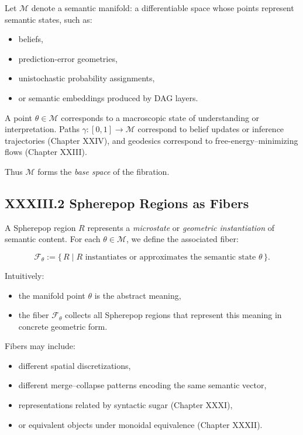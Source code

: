 \documentclass[11pt,letterpaper]{article}
\begin{document}
Let $\mathcal{M}$ denote a semantic manifold: a differentiable space whose points represent semantic states, such as:

\begin{itemize}
    \item beliefs,
    \item prediction-error geometries,
    \item unistochastic probability assignments,
    \item or semantic embeddings produced by DAG layers.
\end{itemize}

A point $\theta \in \mathcal{M}$ corresponds to a macroscopic state of understanding or interpretation. Paths $\gamma : [0,1] \to \mathcal{M}$ correspond to belief updates or inference trajectories (Chapter XXIV), and geodesics correspond to free-energy–minimizing flows (Chapter XXIII).

Thus $\mathcal{M}$ forms the \emph{base space} of the fibration.

\subsection{XXXIII.2 Spherepop Regions as Fibers}

A Spherepop region $R$ represents a \emph{microstate} or \emph{geometric instantiation} of semantic content. For each $\theta \in \mathcal{M}$, we define the associated fiber:

\[
\mathcal{F}_\theta := \{\, R \mid R \text{ instantiates or approximates the semantic state } \theta \,\}.
\]

Intuitively:

\begin{itemize}
    \item the manifold point $\theta$ is the abstract meaning,
    \item the fiber $\mathcal{F}_\theta$ collects all Spherepop regions that represent this meaning in concrete geometric form.
\end{itemize}

Fibers may include:

\begin{itemize}
    \item different spatial discretizations,
    \item different merge--collapse patterns encoding the same semantic vector,
    \item representations related by syntactic sugar (Chapter XXXI),
    \item or equivalent objects under monoidal equivalence (Chapter XXXII).
\end{itemize}
\end{document}
